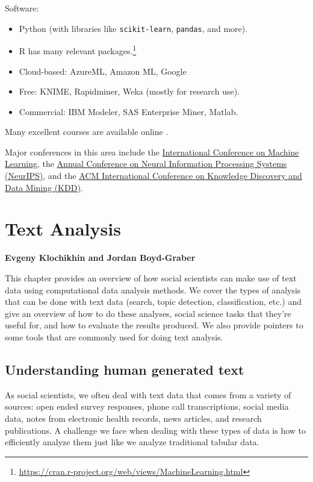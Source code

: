 \documentclass[]{krantz}
\begin{document}
Software:

\begin{itemize}
\item
  Python (with libraries like \texttt{scikit-learn}, \texttt{pandas},
  and more).
\item
  R has many relevant packages.\footnote{\url{https://cran.r-project.org/web/views/MachineLearning.html}}
\item
  Cloud-based: AzureML, Amazon ML, Google
\item
  Free: KNIME, Rapidminer, Weka (mostly for research use).
\item
  Commercial: IBM Modeler, SAS Enterprise Miner, Matlab.
\end{itemize}

Many excellent courses are available online \citep{MLcourses}.

Major conferences in this area include the
\href{https://icml.cc/}{International Conference on Machine Learning},
the \href{https://nips.cc/}{Annual Conference on Neural Information
Processing Systems (NeurIPS)}, and the \href{https://www.kdd.org/}{ACM
International Conference on Knowledge Discovery and Data Mining (KDD)}.

\hypertarget{chap:text}{\chapter{Text Analysis}\label{chap:text}}

\textbf{Evgeny Klochikhin and Jordan Boyd-Graber}

This chapter provides an overview of how social scientists can make use
of text data using computational data analysis methods. We cover the
types of analysis that can be done with text data (search, topic
detection, classification, etc.) and give an overview of how to do these
analyses, social science tasks that they're useful for, and how to
evaluate the results produced. We also provide pointers to some tools
that are commonly used for doing text analysis.

\section{Understanding human generated
text}\label{understanding-human-generated-text}

As social scientists, we often deal with text data that comes from a
variety of sources: open ended survey responses, phone call
transcriptions, social media data, notes from electronic health records,
news articles, and research publications. A challenge we face when
dealing with these types of data is how to efficiently analyze them just
like we analyze traditional tabular data.
\end{document}
